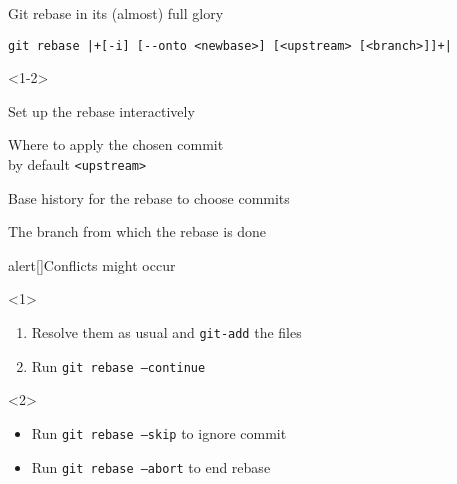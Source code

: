 \documentclass[usenames,svgnames,14pt]{beamer}
\begin{document}
\begin{frame}[fragile]{Git rebase in its (almost) full glory}
    \begin{lstlisting}[style=MyBash, xleftmargin=5mm, xrightmargin=5mm, aboveskip=-5mm, belowskip=-3mm]
        git rebase |+[-i] [--onto <newbase>] [<upstream> [<branch>]]+|
    \end{lstlisting}
    \begin{overlayarea}{\textwidth}{0.5\textheight}
        \begin{onlyenv}<1-2>
            \begin{description}
                \item[-i] Set up the rebase interactively
                \item[<newbase>] Where to apply the chosen commit\\ \then by default \texttt{<upstream>}
                \item[<upstream>] Base history for the rebase to choose commits
                \item[<branch>] The branch from which the rebase is done
            \end{description}
            \begin{varblock*}{alert}[\textwidth]{Conflicts might occur}
                \begin{overlayarea}{\textwidth}{0.12\textheight}
                    \begin{onlyenv}<1>
                        \begin{enumerate}
                            \item Resolve them as usual and \;\texttt{git-add}\; the files
                            \item Run \;\texttt{git rebase --continue}
                        \end{enumerate}
                    \end{onlyenv}
                    \begin{onlyenv}<2>
                        \vspace{-3pt}
                        \begin{itemize}
                            \item Run \;\texttt{git rebase --skip}\; to ignore commit
                            \item Run \;\texttt{git rebase --abort}\; to end rebase

\end{itemize}
\end{onlyenv}
\end{overlayarea}
\end{varblock*}
\end{onlyenv}
\end{overlayarea}
\end{frame}
\end{document}
